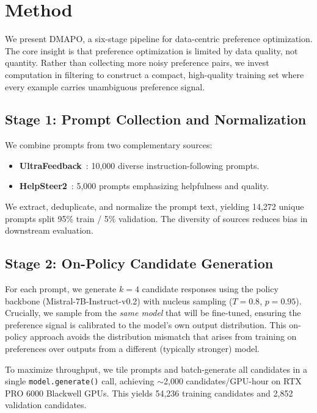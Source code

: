 \documentclass{article}
\newcommand{\ours}{\textsc{DMAPO}}
\begin{document}
\section{Method}
\label{sec:method}

We present \ours{}, a six-stage pipeline for data-centric preference optimization.
The core insight is that preference optimization is limited by data quality, not quantity.
Rather than collecting more noisy preference pairs, we invest computation in filtering to construct a compact, high-quality training set where every example carries unambiguous preference signal.

\subsection{Stage 1: Prompt Collection and Normalization}
\label{sec:stage1}

We combine prompts from two complementary sources:
\begin{itemize}[leftmargin=*,itemsep=0.5ex]
  \item \textbf{UltraFeedback}~\cite{cui2023ultrafeedback}: 10,000 diverse instruction-following prompts.
  \item \textbf{HelpSteer2}~\cite{wang2024helpsteer2}: 5,000 prompts emphasizing helpfulness and quality.
\end{itemize}
We extract, deduplicate, and normalize the prompt text, yielding 14,272 unique prompts split 95\% train / 5\% validation.
The diversity of sources reduces bias in downstream evaluation.

\subsection{Stage 2: On-Policy Candidate Generation}
\label{sec:stage2}

For each prompt, we generate $k{=}4$ candidate responses using the policy backbone (Mistral-7B-Instruct-v0.2) with nucleus sampling ($T{=}0.8$, $p{=}0.95$).
Crucially, we sample from the \emph{same model} that will be fine-tuned, ensuring the preference signal is calibrated to the model's own output distribution.
This on-policy approach avoids the distribution mismatch that arises from training on preferences over outputs from a different (typically stronger) model.

To maximize throughput, we tile prompts and batch-generate all candidates in a single \texttt{model.generate()} call, achieving $\sim$2,000 candidates/GPU-hour on RTX PRO 6000 Blackwell GPUs.
This yields 54,236 training candidates and 2,852 validation candidates.
\end{document}

